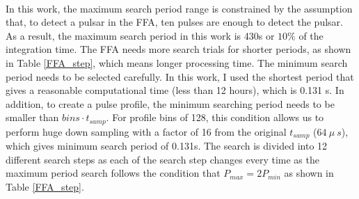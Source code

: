 \documentclass[thesis_msc.tex]{subfiles}
\begin{document}
\paragraph{} In this work, the maximum search period range is constrained by the assumption that, to detect a pulsar in the FFA, ten pulses are enough to detect the pulsar. As a result, the maximum search period in this work is 430s or $10\%$ of the integration time. The FFA needs more search trials for shorter periods, as shown in Table \ref{FFA_step}, which means longer processing time. The minimum search period needs to be selected carefully. In this work, I used the shortest period that gives a reasonable computational time (less than 12 hours), which is 0.131 s. In addition,  to create a pulse profile, the  minimum searching period needs to be smaller than $bins \cdot t_{samp}$. For profile bins of 128, this condition allows us to perform huge down sampling with a factor of 16 from the original $t_{samp}$ ($64~\mu~s$), which gives minimum search period of 0.131s. The search is divided into 12 different search steps as each of the search step changes every time as the maximum period search follows the condition that $P_{max}=2 P_{min}$ as shown in Table \ref{FFA_step}.       

\end{document}

